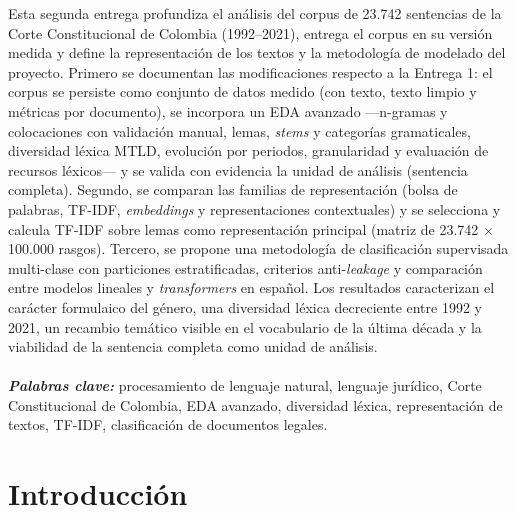 \documentclass[11pt]{tg_usta}
\begin{document}
\begin{mainabstract}

Esta segunda entrega profundiza el análisis del corpus de 23.742 sentencias de la Corte Constitucional de Colombia (1992--2021), entrega el corpus en su versión medida y define la representación de los textos y la metodología de modelado del proyecto. Primero se documentan las modificaciones respecto a la Entrega 1: el corpus se persiste como conjunto de datos medido (con texto, texto limpio y métricas por documento), se incorpora un EDA avanzado ---n-gramas y colocaciones con validación manual, lemas, \emph{stems} y categorías gramaticales, diversidad léxica MTLD, evolución por periodos, granularidad y evaluación de recursos léxicos--- y se valida con evidencia la unidad de análisis (sentencia completa). Segundo, se comparan las familias de representación (bolsa de palabras, TF-IDF, \emph{embeddings} y representaciones contextuales) y se selecciona y calcula TF-IDF sobre lemas como representación principal (matriz de 23.742 $\times$ 100.000 rasgos). Tercero, se propone una metodología de clasificación supervisada multi-clase con particiones estratificadas, criterios anti-\emph{leakage} y comparación entre modelos lineales y \emph{transformers} en español. Los resultados caracterizan el carácter formulaico del género, una diversidad léxica decreciente entre 1992 y 2021, un recambio temático visible en el vocabulario de la última década y la viabilidad de la sentencia completa como unidad de análisis.\\\\
\textit{\textbf{Palabras clave:}} procesamiento de lenguaje natural, lenguaje jurídico, Corte Constitucional de Colombia, EDA avanzado, diversidad léxica, representación de textos, TF-IDF, clasificación de documentos legales.

\end{mainabstract}

\section{Introducción}
\end{document}
